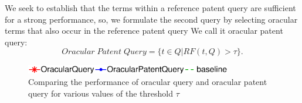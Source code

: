 We seek to establish that the terms within a reference patent query are sufficient for a strong performance, so, we formulate the second query by selecting oracular terms that also occur in the reference patent query We call it oracular patent query:
\begin{equation}
 Oracular \; Patent \; Query = \{t\in Q|RF(t, Q)>\tau\}.   
 \label{eq:score}
\end{equation}
\begin{figure}[t!]
\begin{centering}
\includegraphics[width=9cm]{figs/l1}
\par\end{centering}

\begin{centering}
\hspace*{1.5cm}  
\par\end{centering} 

\protect\caption{Comparing the performance of oracular query and oracular patent query for various values of the threshold $\tau$}
\label{fig:oracularpq}
\end{figure}
